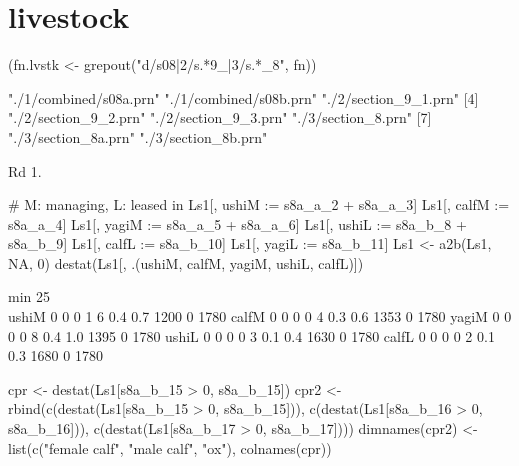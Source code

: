 \section{livestock}


\begin{Schunk}
\begin{Sinput}
(fn.lvstk <- grepout("d/s08|2/s.*9_|3/s.*_8", fn))
\end{Sinput}
\begin{Soutput}
[1] "./1/combined/s08a.prn" "./1/combined/s08b.prn" "./2/section_9_1.prn"  
[4] "./2/section_9_2.prn"   "./2/section_9_3.prn"   "./3/section_8.prn"    
[7] "./3/section_8a.prn"    "./3/section_8b.prn"   
\end{Soutput}
\end{Schunk}
Rd 1.
\begin{Schunk}
\begin{Sinput}
# M: managing, L: leased in
Ls1[, ushiM := s8a_a_2 + s8a_a_3]
Ls1[, calfM := s8a_a_4]
Ls1[, yagiM := s8a_a_5 + s8a_a_6]
Ls1[, ushiL := s8a_b_8 + s8a_b_9]
Ls1[, calfL := s8a_b_10]
Ls1[, yagiL := s8a_b_11]
Ls1 <- a2b(Ls1, NA, 0)
destat(Ls1[, .(ushiM, calfM, yagiM, ushiL, calfL)])
\end{Sinput}
\begin{Soutput}
      min 25\\% median 75\\% max mean std   0s NAs    n
ushiM   0     0      0     1   6  0.4 0.7 1200   0 1780
calfM   0     0      0     0   4  0.3 0.6 1353   0 1780
yagiM   0     0      0     0   8  0.4 1.0 1395   0 1780
ushiL   0     0      0     0   3  0.1 0.4 1630   0 1780
calfL   0     0      0     0   2  0.1 0.3 1680   0 1780
\end{Soutput}
\begin{Sinput}
cpr <- destat(Ls1[s8a_b_15 > 0, s8a_b_15])
cpr2 <- rbind(c(destat(Ls1[s8a_b_15 > 0, s8a_b_15])),
c(destat(Ls1[s8a_b_16 > 0, s8a_b_16])),
c(destat(Ls1[s8a_b_17 > 0, s8a_b_17])))
dimnames(cpr2) <- list(c("female calf", "male calf", "ox"),
	colnames(cpr))
\end{Sinput}
\end{Schunk}
